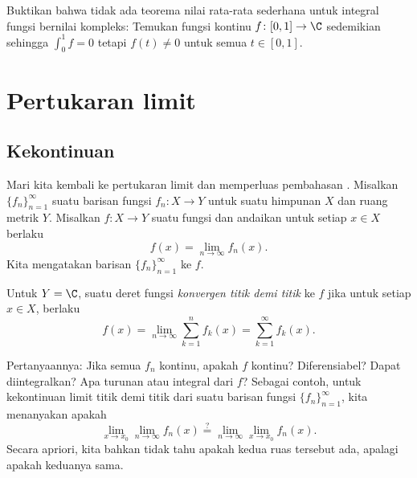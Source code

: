 \begin{exercise}
Buktikan bahwa tidak ada teorema nilai rata-rata sederhana untuk integral
fungsi bernilai kompleks:
Temukan fungsi kontinu $f \colon [0,1] \to \C$ sedemikian sehingga
$\int_0^1 f = 0$ tetapi $f(t) \neq 0$ untuk semua $t \in [0,1]$.
\end{exercise}



\sectionnewpage
\section{Pertukaran limit}
\label{sec:swaplim}



\subsection{Kekontinuan}

Mari kita kembali ke pertukaran limit dan memperluas pembahasan
.
Misalkan $\{ f_n \}_{n=1}^\infty$ suatu barisan
fungsi $f_n \colon X \to Y$ untuk suatu himpunan $X$ dan ruang metrik $Y$.
Misalkan $f \colon X \to Y$ suatu
fungsi dan andaikan untuk setiap $x \in X$ berlaku
\begin{equation*}
f(x) = \lim_{n\to \infty} f_n(x) .
\end{equation*}
Kita mengatakan barisan $\{ f_n \}_{n=1}^\infty$
\emph{} ke $f$.

Untuk $Y=\C$, suatu deret fungsi
\emph{konvergen titik demi titik} ke $f$ jika
untuk setiap $x \in X$, berlaku
\begin{equation*}
f(x) = \lim_{n\to \infty} \sum_{k=1}^n f_k(x) =
\sum_{k=1}^\infty f_k(x) .
\end{equation*}

\medskip

Pertanyaannya:
Jika semua $f_n$ kontinu, apakah $f$ kontinu?  Diferensiabel?
Dapat diintegralkan?  Apa turunan atau integral dari $f$?
Sebagai contoh, untuk kekontinuan limit titik demi titik dari suatu barisan
fungsi
$\{ f_n \}_{n=1}^\infty$, kita menanyakan apakah
\begin{equation*}
\lim_{x\to x_0} \lim_{n\to\infty} f_n(x)
\overset{?}{=}
\lim_{n\to\infty} \lim_{x\to x_0} f_n(x) .
\end{equation*}
Secara apriori, kita bahkan tidak tahu apakah kedua ruas tersebut ada,
apalagi apakah keduanya sama.

